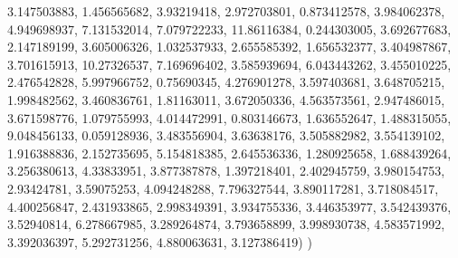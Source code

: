 \documentclass[
  11pt,
]{article}
\newenvironment{Shaded}{\begin{snugshade}}{\end{snugshade}}
\newcommand{\FloatTok}[1]{\textcolor[rgb]{0.68,0.00,0.00}{#1}}
\newcommand{\NormalTok}[1]{\textcolor[rgb]{0.00,0.23,0.31}{#1}}
\begin{document}
\begin{Shaded}
\begin{Highlighting}[]
        \FloatTok{3.147503883}\NormalTok{, }\FloatTok{1.456565682}\NormalTok{, }\FloatTok{3.93219418}\NormalTok{, }\FloatTok{2.972703801}\NormalTok{, }\FloatTok{0.873412578}\NormalTok{, }\FloatTok{3.984062378}\NormalTok{,}
        \FloatTok{4.949698937}\NormalTok{, }\FloatTok{7.131532014}\NormalTok{, }\FloatTok{7.079722233}\NormalTok{, }\FloatTok{11.86116384}\NormalTok{, }\FloatTok{0.244303005}\NormalTok{, }\FloatTok{3.692677683}\NormalTok{,}
        \FloatTok{2.147189199}\NormalTok{, }\FloatTok{3.605006326}\NormalTok{, }\FloatTok{1.032537933}\NormalTok{, }\FloatTok{2.655585392}\NormalTok{, }\FloatTok{1.656532377}\NormalTok{, }\FloatTok{3.404987867}\NormalTok{,}
        \FloatTok{3.701615913}\NormalTok{, }\FloatTok{10.27326537}\NormalTok{, }\FloatTok{7.169696402}\NormalTok{, }\FloatTok{3.585939694}\NormalTok{, }\FloatTok{6.043443262}\NormalTok{, }\FloatTok{3.455010225}\NormalTok{,}
        \FloatTok{2.476542828}\NormalTok{, }\FloatTok{5.997966752}\NormalTok{, }\FloatTok{0.75690345}\NormalTok{, }\FloatTok{4.276901278}\NormalTok{, }\FloatTok{3.597403681}\NormalTok{, }\FloatTok{3.648705215}\NormalTok{,}
        \FloatTok{1.998482562}\NormalTok{, }\FloatTok{3.460836761}\NormalTok{, }\FloatTok{1.81163011}\NormalTok{, }\FloatTok{3.672050336}\NormalTok{, }\FloatTok{4.563573561}\NormalTok{, }\FloatTok{2.947486015}\NormalTok{,}
        \FloatTok{3.671598776}\NormalTok{, }\FloatTok{1.079755993}\NormalTok{, }\FloatTok{4.014472991}\NormalTok{, }\FloatTok{0.803146673}\NormalTok{, }\FloatTok{1.636552647}\NormalTok{, }\FloatTok{1.488315055}\NormalTok{,}
        \FloatTok{9.048456133}\NormalTok{, }\FloatTok{0.059128936}\NormalTok{, }\FloatTok{3.483556904}\NormalTok{, }\FloatTok{3.63638176}\NormalTok{, }\FloatTok{3.505882982}\NormalTok{, }\FloatTok{3.554139102}\NormalTok{,}
        \FloatTok{1.916388836}\NormalTok{, }\FloatTok{2.152735695}\NormalTok{, }\FloatTok{5.154818385}\NormalTok{, }\FloatTok{2.645536336}\NormalTok{, }\FloatTok{1.280925658}\NormalTok{, }\FloatTok{1.688439264}\NormalTok{,}
        \FloatTok{3.256380613}\NormalTok{, }\FloatTok{4.33833951}\NormalTok{, }\FloatTok{3.877387878}\NormalTok{, }\FloatTok{1.397218401}\NormalTok{, }\FloatTok{2.402945759}\NormalTok{, }\FloatTok{3.980154753}\NormalTok{,}
        \FloatTok{2.93424781}\NormalTok{, }\FloatTok{3.59075253}\NormalTok{, }\FloatTok{4.094248288}\NormalTok{, }\FloatTok{7.796327544}\NormalTok{, }\FloatTok{3.890117281}\NormalTok{, }\FloatTok{3.718084517}\NormalTok{,}
        \FloatTok{4.400256847}\NormalTok{, }\FloatTok{2.431933865}\NormalTok{, }\FloatTok{2.998349391}\NormalTok{, }\FloatTok{3.934755336}\NormalTok{, }\FloatTok{3.446353977}\NormalTok{, }\FloatTok{3.542439376}\NormalTok{,}
        \FloatTok{3.52940814}\NormalTok{, }\FloatTok{6.278667985}\NormalTok{, }\FloatTok{3.289264874}\NormalTok{, }\FloatTok{3.793658899}\NormalTok{, }\FloatTok{3.998930738}\NormalTok{, }\FloatTok{4.583571992}\NormalTok{,}
        \FloatTok{3.392036397}\NormalTok{, }\FloatTok{5.292731256}\NormalTok{, }\FloatTok{4.880063631}\NormalTok{, }\FloatTok{3.127386419}\NormalTok{)}
\NormalTok{)}



\end{Highlighting}
\end{Shaded}
\end{document}
